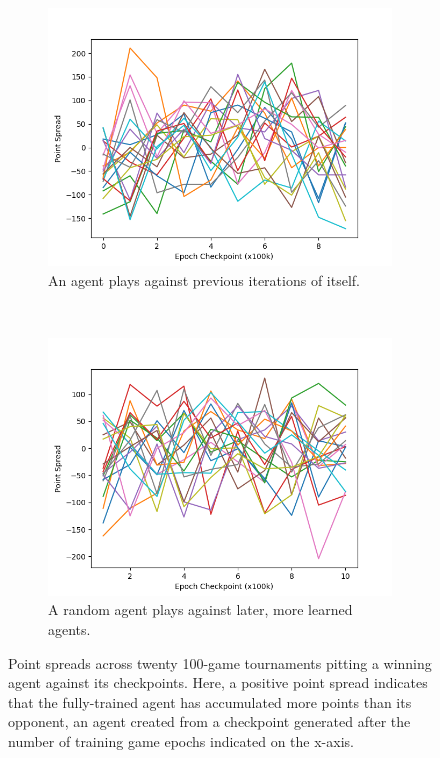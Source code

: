 
\begin{figure}
\center

\begin{subfigure}[b]{0.45\textwidth}
	\includegraphics[width=\linewidth]{images/findings/round1/spreads.png}
	\caption{An agent plays against previous iterations of itself.}
	\label{fig_r1-spreads_a}
\end{subfigure}
~
\begin{subfigure}[b]{0.45\textwidth}
	\includegraphics[width=\linewidth]{images/findings/round1/random-spreads.png}
	\caption{A random agent plays against later, more learned agents.}
	\label{fig_r1-spreads_b}
\end{subfigure}


\caption{
	Point spreads across twenty 100-game tournaments pitting a winning
	agent against its checkpoints.
	Here, a positive point spread indicates that the fully-trained agent has
	accumulated more points than its opponent,
	an agent created from a checkpoint generated after the number of training
	game epochs indicated on the x-axis.
}
\label{fig_r1-spreads}
\end{figure}
